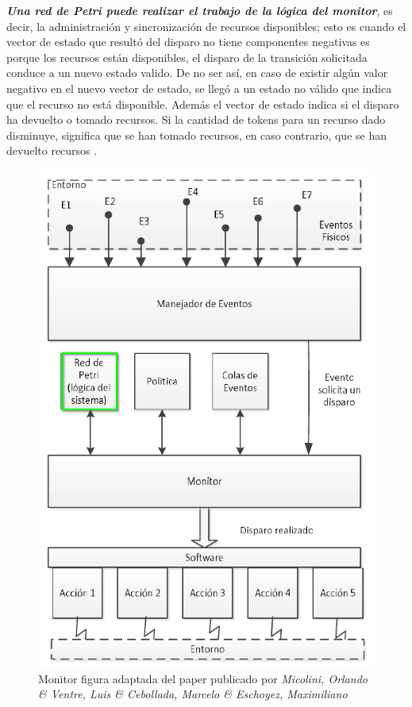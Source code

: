 \par \textbf{\textit{Una red de Petri puede realizar el trabajo de la lógica del monitor}}, es decir, la administración y sincronización de recursos disponibles; esto es cuando el vector de estado que resultó del disparo no tiene componentes negativas es porque los recursos están disponibles, el disparo de la transición solicitada conduce a un nuevo estado valido. De no ser así, en caso de existir algún valor negativo en el nuevo vector de estado, se llegó a un estado no válido que indica que el recurso no está disponible. Además el vector de estado indica si el disparo ha devuelto o tomado recursos. Si la cantidad de tokens para un recurso dado disminuye, significa que se han tomado recursos, en caso contrario, que se han devuelto recursos \cite{papermico}.

\begin{figure}[H]
    \centering
    \includegraphics[scale=0.5]{images/monitor_mico_1.png}
    \caption[Monitor.]{Monitor figura adaptada del paper publicado por \textit{Micolini, Orlando \& Ventre, Luis \& Cebollada, Marcelo \& Eschoyez, Maximiliano}\cite{papermico}}
    \label{fig:monitormico1}
\end{figure}

